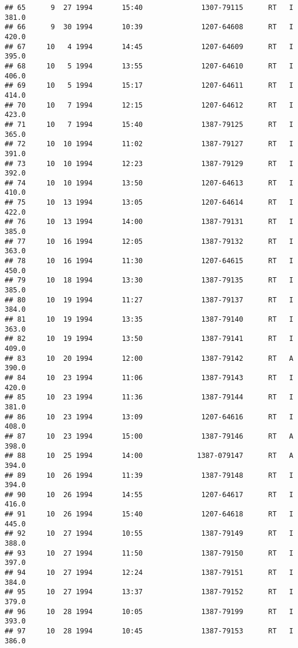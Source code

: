 \documentclass[
]{article}
\begin{document}
\begin{verbatim}
## 65      9  27 1994       15:40              1307-79115      RT   I     381.0
## 66      9  30 1994       10:39              1207-64608      RT   I     420.0
## 67     10   4 1994       14:45              1207-64609      RT   I     395.0
## 68     10   5 1994       13:55              1207-64610      RT   I     406.0
## 69     10   5 1994       15:17              1207-64611      RT   I     414.0
## 70     10   7 1994       12:15              1207-64612      RT   I     423.0
## 71     10   7 1994       15:40              1387-79125      RT   I     365.0
## 72     10  10 1994       11:02              1387-79127      RT   I     391.0
## 73     10  10 1994       12:23              1387-79129      RT   I     392.0
## 74     10  10 1994       13:50              1207-64613      RT   I     410.0
## 75     10  13 1994       13:05              1207-64614      RT   I     422.0
## 76     10  13 1994       14:00              1387-79131      RT   I     385.0
## 77     10  16 1994       12:05              1387-79132      RT   I     363.0
## 78     10  16 1994       11:30              1207-64615      RT   I     450.0
## 79     10  18 1994       13:30              1387-79135      RT   I     385.0
## 80     10  19 1994       11:27              1387-79137      RT   I     384.0
## 81     10  19 1994       13:35              1387-79140      RT   I     363.0
## 82     10  19 1994       13:50              1387-79141      RT   I     409.0
## 83     10  20 1994       12:00              1387-79142      RT   A     390.0
## 84     10  23 1994       11:06              1387-79143      RT   I     420.0
## 85     10  23 1994       11:36              1387-79144      RT   I     381.0
## 86     10  23 1994       13:09              1207-64616      RT   I     408.0
## 87     10  23 1994       15:00              1387-79146      RT   A     398.0
## 88     10  25 1994       14:00             1387-079147      RT   A     394.0
## 89     10  26 1994       11:39              1387-79148      RT   I     394.0
## 90     10  26 1994       14:55              1207-64617      RT   I     416.0
## 91     10  26 1994       15:40              1207-64618      RT   I     445.0
## 92     10  27 1994       10:55              1387-79149      RT   I     388.0
## 93     10  27 1994       11:50              1387-79150      RT   I     397.0
## 94     10  27 1994       12:24              1387-79151      RT   I     384.0
## 95     10  27 1994       13:37              1387-79152      RT   I     379.0
## 96     10  28 1994       10:05              1387-79199      RT   I     393.0
## 97     10  28 1994       10:45              1387-79153      RT   I     386.0

\end{verbatim}
\end{document}
